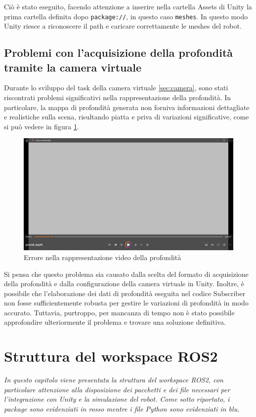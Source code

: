 \documentclass[11pt]{report}
\begin{document}
Ciò è stato eseguito, facendo attenzione a inserire nella cartella Assets di Unity la prima cartella definita dopo \texttt{package://}, in questo caso \texttt{meshes}. In questo modo Unity riesce a riconoscere il path e caricare correttamente le meshes del robot.

\section{Problemi con l'acquisizione della profondità tramite la camera virtuale}
\label{sec:Problemi_camera_virtuale}
Durante lo sviluppo del task della camera virtuale \ref{sec:camera}, sono stati riscontrati problemi significativi nella rappresentazione della profondità. In particolare, la mappa di profondità generata non forniva informazioni dettagliate e realistiche sulla scena, risultando piatta e priva di variazioni significative, come si può vedere in figura \ref{fig:depth}. 

\begin{figure} [H]
    \centering
    \includegraphics[width=1\textwidth]{images/depth.PNG}
    \caption{Errore nella rappresentazione video della profondità}
    \label{fig:depth}
\end{figure}

Si pensa che questo problema sia causato dalla scelta del formato di acquisizione della profondità e dalla configurazione della camera virtuale in Unity. Inoltre, è possibile che l'elaborazione dei dati di profondità eseguita nel codice Subscriber non fosse sufficientemente robusta per gestire le variazioni di profondità in modo accurato. Tuttavia, purtroppo, per mancanza di tempo non è stato possibile approfondire ulteriormente il problema e trovare una soluzione definitiva. 

\chapter{Struttura del workspace ROS2}
\textit{In questo capitolo viene presentata la struttura del workspace ROS2, con particolare attenzione alla disposizione dei pacchetti e dei file necessari per l'integrazione con Unity e la simulazione del robot. Come sotto riportato, i package sono evidenziati in rosso mentre i file Python sono evidenziati in blu.}
\end{document}
